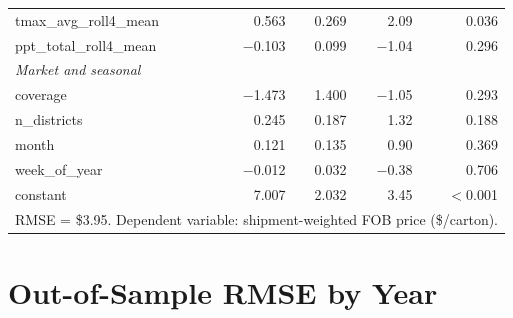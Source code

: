 \documentclass[12pt]{article}
\begin{document}
\begin{table}[H]
\begin{tabular}{lrrrr}
\quad tmax\_avg\_roll4\_mean & 0.563 & 0.269 & 2.09 & 0.036 \\
\quad ppt\_total\_roll4\_mean & $-$0.103 & 0.099 & $-$1.04 & 0.296 \\
\addlinespace
\textit{Market and seasonal} \\
\quad coverage & $-$1.473 & 1.400 & $-$1.05 & 0.293 \\
\quad n\_districts & 0.245 & 0.187 & 1.32 & 0.188 \\
\quad month & 0.121 & 0.135 & 0.90 & 0.369 \\
\quad week\_of\_year & $-$0.012 & 0.032 & $-$0.38 & 0.706 \\
\quad constant & 7.007 & 2.032 & 3.45 & $<$0.001 \\
\midrule
\multicolumn{5}{l}{RMSE = \$3.95. Dependent variable: shipment-weighted FOB price (\$/carton).} \\
\bottomrule
\end{tabular}
\end{table}

\section{Out-of-Sample RMSE by Year}
\label{app:yearly_rmse}
\end{document}
